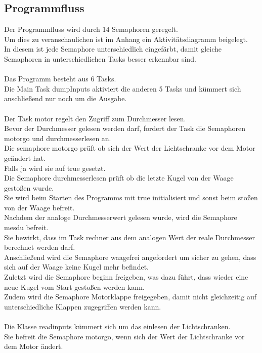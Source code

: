 \subsection{Programmfluss}
Der Programmfluss wird durch 14 Semaphoren geregelt.\\
Um dies zu veranschaulichen ist im Anhang ein Aktivitätsdiagramm beigelegt.\\
In diesem ist jede Semaphore unterschiedlich eingefärbt, damit gleiche Semaphoren in unterschiedlichen Tasks besser erkennbar sind.\\
\\
Das Programm besteht aus 6 Tasks.\\
Die Main Task dumpInputs aktiviert die anderen 5 Tasks und kümmert sich anschließend nur noch um die Ausgabe.\\
\\
Der Task motor regelt den Zugriff zum Durchmesser lesen.\\
Bevor der Durchmesser gelesen werden darf, fordert der Task die Semaphoren motorgo und durchmesserlesen an.\\
Die semaphore motorgo prüft ob sich der Wert der Lichtschranke vor dem Motor geändert hat.\\
Falls ja wird sie auf true gesetzt.\\
Die Semaphore durchmesserlesen prüft ob die letzte Kugel von der Waage gestoßen wurde.\\
Sie wird beim Starten des Programms mit true initialisiert und sonst beim stoßen von der Waage befreit.\\
Nachdem der analoge Durchmesserwert gelesen wurde, wird die Semaphore mesdu befreit.\\
Sie bewirkt, dass im Task rechner aus dem analogen Wert der reale Durchmesser berechnet werden darf.\\
Anschließend wird die Semaphore waagefrei angefordert um sicher zu gehen, dass sich auf der Waage keine Kugel mehr befindet.\\
Zuletzt wird die Semaphore beginn freigeben, was dazu führt, dass wieder eine neue Kugel vom Start gestoßen werden kann.\\
Zudem wird die Semaphore Motorklappe freigegeben, damit nicht gleichzeitig auf unterschiedliche Klappen zugegriffen werden kann.\\
\\
Die Klasse readinputs kümmert sich um das einlesen der Lichtschranken.\\
Sie befreit die Semaphore motorgo, wenn sich der Wert der Lichtschranke vor dem Motor ändert.\\
